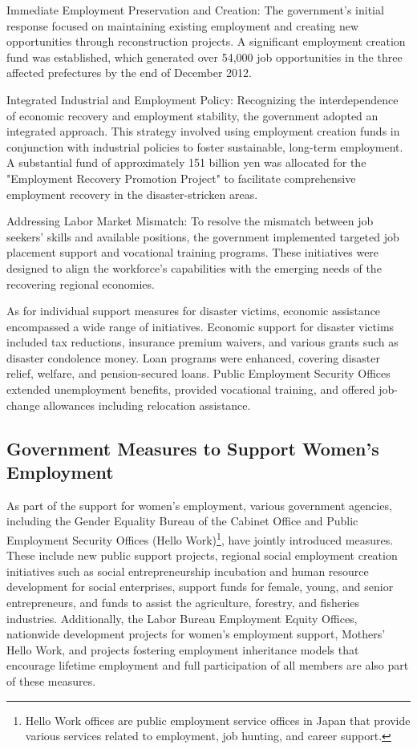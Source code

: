 \documentclass[a4paper,12pt]{article}
\begin{document}
Immediate Employment Preservation and Creation:
The government's initial response focused on maintaining existing employment and creating new opportunities through reconstruction projects. A significant employment creation fund was established, which generated over 54,000 job opportunities in the three affected prefectures by the end of December 2012.

Integrated Industrial and Employment Policy:
Recognizing the interdependence of economic recovery and employment stability, the government adopted an integrated approach. This strategy involved using employment creation funds in conjunction with industrial policies to foster sustainable, long-term employment. A substantial fund of approximately 151 billion yen was allocated for the "Employment Recovery Promotion Project" to facilitate comprehensive employment recovery in the disaster-stricken areas.

Addressing Labor Market Mismatch:
To resolve the mismatch between job seekers' skills and available positions, the government implemented targeted job placement support and vocational training programs. These initiatives were designed to align the workforce's capabilities with the emerging needs of the recovering regional economies.


As for individual support measures for disaster victims, economic assistance encompassed a wide range of initiatives. Economic support for disaster victims included tax reductions, insurance premium waivers, and various grants such as disaster condolence money. Loan programs were enhanced, covering disaster relief, welfare, and pension-secured loans. Public Employment Security Offices extended unemployment benefits, provided vocational training, and offered job-change allowances including relocation assistance.

\subsection{Government Measures to Support Women's Employment}

As part of the support for women's employment, various government agencies, including the Gender Equality Bureau of the Cabinet Office and Public Employment Security Offices (Hello Work)\footnote{Hello Work offices are public employment service offices in Japan that provide various services related to employment, job hunting, and career support.}, have jointly introduced measures. These include new public support projects, regional social employment creation initiatives such as social entrepreneurship incubation and human resource development for social enterprises, support funds for female, young, and senior entrepreneurs, and funds to assist the agriculture, forestry, and fisheries industries. Additionally, the Labor Bureau Employment Equity Offices, nationwide development projects for women's employment support, Mothers' Hello Work, and projects fostering employment inheritance models that encourage lifetime employment and full participation of all members are also part of these measures.
\end{document}
